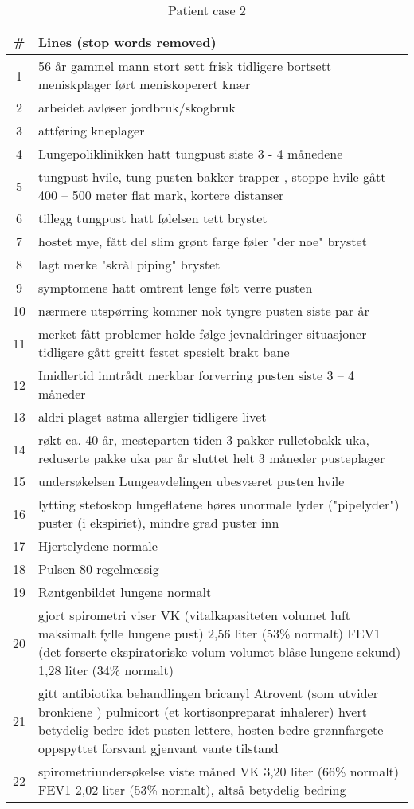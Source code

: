 \begin{table}[htbp] \footnotesize \center
\caption{Patient case 2\label{tab:pcase2}}
\begin{tabularx}{\textwidth}{c X}
    \toprule
    \# & Lines (stop words removed) \\
    \midrule
	1 & 56 år gammel mann stort sett frisk tidligere bortsett meniskplager ført meniskoperert knær \\
	2 & arbeidet avløser jordbruk/skogbruk \\
	3 & attføring kneplager \\
	4 & Lungepoliklinikken hatt tungpust siste 3 - 4 månedene \\
	5 & tungpust hvile, tung pusten bakker trapper , stoppe hvile gått 400 -- 500 meter flat mark, kortere distanser \\
	6 & tillegg tungpust hatt følelsen tett brystet \\
	7 & hostet mye, fått del slim grønt farge føler "der noe" brystet \\
	8 & lagt merke "skrål piping" brystet \\
	9 & symptomene hatt omtrent lenge følt verre pusten \\
	10 & nærmere utspørring kommer nok tyngre pusten siste par år \\
	11 & merket fått problemer holde følge jevnaldringer situasjoner tidligere gått greitt festet spesielt brakt bane \\
	12 & Imidlertid inntrådt merkbar forverring pusten siste 3 -- 4 måneder \\
	13 & aldri plaget astma allergier tidligere livet \\
	14 & røkt ca. 40 år, mesteparten tiden 3 pakker rulletobakk uka, reduserte pakke uka par år sluttet helt 3 måneder pusteplager \\
	15 & undersøkelsen Lungeavdelingen ubesværet pusten hvile \\
	16 & lytting stetoskop lungeflatene høres unormale lyder ("pipelyder") puster (i ekspiriet), mindre grad puster inn \\
	17 & Hjertelydene normale \\
	18 & Pulsen 80 regelmessig \\
	19 & Røntgenbildet lungene normalt \\
	20 & gjort spirometri viser VK (vitalkapasiteten volumet luft maksimalt fylle lungene pust) 2,56 liter (53\% normalt) FEV1 (det forserte ekspiratoriske volum volumet blåse lungene sekund) 1,28 liter (34\% normalt) \\
	21 & gitt antibiotika behandlingen bricanyl Atrovent (som utvider bronkiene ) pulmicort (et kortisonpreparat inhalerer) hvert betydelig bedre idet pusten lettere, hosten bedre grønnfargete oppspyttet forsvant gjenvant vante tilstand \\
	22 & spirometriundersøkelse viste måned VK 3,20 liter (66\% normalt) FEV1 2,02 liter (53\% normalt), altså betydelig bedring \\
	\bottomrule
\end{tabularx}
\end{table}


